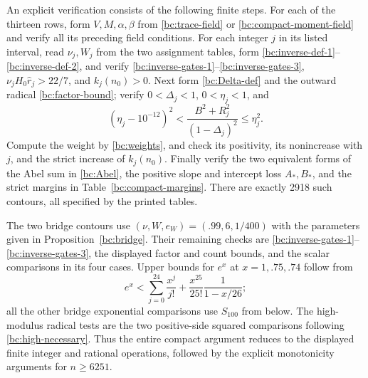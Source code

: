 An explicit verification consists of the following finite steps.
For each of the thirteen rows, form $V,M,\alpha,\beta$ from
\eqref{bc:trace-field} or \eqref{bc:compact-moment-field} and verify
all its preceding field conditions.  For each integer $j$ in its
listed interval, read $\nu_j,W_j$ from the two assignment tables,
form \eqref{bc:inverse-def-1}--\eqref{bc:inverse-def-2}, and verify
\eqref{bc:inverse-gates-1}--\eqref{bc:inverse-gates-3},
$\nu_jH_0\widehat r_j>22/7$, and $k_j(n_0)>0$.
Next form \eqref{bc:Delta-def} and the outward radical
\eqref{bc:factor-bound}; verify $0<\Delta_j<1$, $0<\eta_j<1$,
and
\[
 (\eta_j-10^{-12})^2<
 \frac{B^2+R_j^2}{(1-\Delta_j)^2}\leq\eta_j^2.
\]
Compute the weight by \eqref{bc:weights}, and check its positivity,
its nonincrease with $j$, and the strict increase of $k_j(n_0)$.
Finally verify the two equivalent forms of the Abel sum in
\eqref{bc:Abel}, the positive slope and intercept loss $A_*,B_*$,
and the strict margins in Table~\ref{bc:compact-margins}.
There are exactly 2918 such contours, all specified by the printed
tables.

The two bridge contours use $(\nu,W,e_W)=(.99,6,1/400)$ with the
parameters given in Proposition~\ref{bc:bridge}.  Their remaining
checks are \eqref{bc:inverse-gates-1}--\eqref{bc:inverse-gates-3},
the displayed factor and count bounds, and the scalar comparisons
in its four cases.  Upper bounds for $e^x$ at
$x=1,.75,.74$ follow from
\[
 e^x<\sum_{j=0}^{24}\frac{x^j}{j!}
       +\frac{x^{25}}{25!}\frac1{1-x/26};
\]
all the other bridge exponential comparisons use $S_{100}$ from below.
The high-modulus radical tests are the two positive-side squared
comparisons following \eqref{bc:high-necessary}.
Thus the entire compact argument reduces to the displayed finite
integer and rational operations, followed by the explicit monotonicity
arguments for $n\geq6251$.
